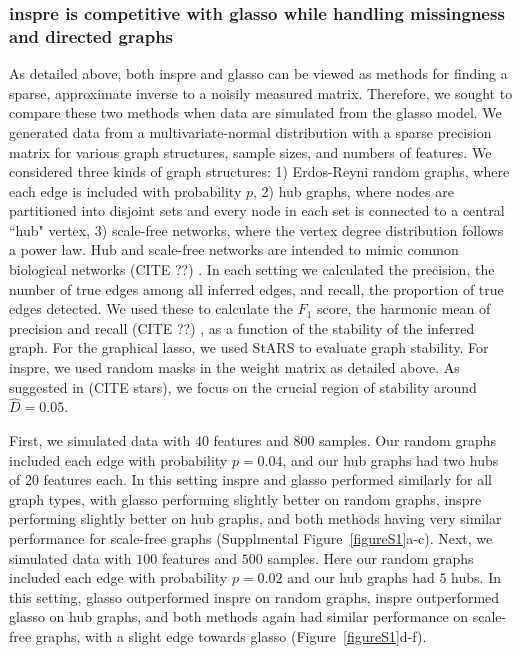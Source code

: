 \documentclass{article}
\begin{document}
\subsubsection*{inspre is competitive with glasso while handling missingness and directed graphs}
As detailed above, both inspre and glasso can be viewed as methods
for finding a sparse, approximate inverse to a noisily measured matrix.
Therefore, we sought to compare these two methods when data are simulated
from the glasso model. We generated data
from a multivariate-normal distribution with a sparse precision matrix
for various graph structures, sample sizes, and numbers of features.
We considered three kinds of graph structures: 1) Erdos-Reyni random graphs,
where each edge is included with probability $p$, 2) hub graphs, where nodes
are partitioned into
disjoint sets and every node in each set is connected to a central ``hub" vertex,
3) scale-free networks, where the vertex degree distribution
follows a power law. Hub and scale-free networks are intended to mimic common
biological networks (CITE ??) . In each setting we calculated the precision,
the number of true edges among all inferred edges, and recall, the proportion
of true edges detected. We used these to calculate the $F_1$ score, the
harmonic mean of precision and recall (CITE ??) , as a function of the
stability of the inferred graph. For the graphical lasso, we used StARS to
evaluate graph stability. For inspre, we used random masks in the weight matrix
as detailed above. As suggested in (CITE stars), we focus on the crucial
region of stability around $\hat{D} = 0.05$. 

First, we simulated data with $40$ features and $800$ samples. Our random
graphs included each edge with probability $p=0.04$, and our hub graphs had
two hubs of $20$ features each. In this setting inspre and glasso performed
similarly for all graph types, with glasso performing slightly better on
random graphs, inspre performing slightly better on hub graphs, and 
both methods having very similar performance for scale-free graphs
(Supplmental Figure~\ref{figureS1}a-c). Next, we simulated  data with $100$
features and $500$ samples. Here our random graphs included each edge with probability $p=0.02$ and our hub graphs had $5$ hubs. In this setting, glasso outperformed inspre on
random graphs, inspre outperformed glasso on hub graphs, and both methods again
had similar performance on scale-free graphs, with a slight edge towards
glasso (Figure~\ref{figureS1}d-f).
\end{document}
